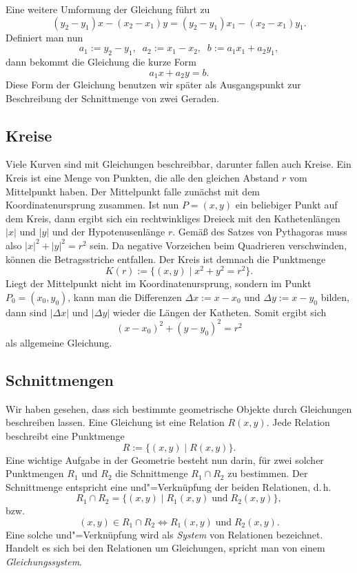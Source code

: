 Eine weitere Umformung der Gleichung führt zu
\[(y_2-y_1)x-(x_2-x_1)y
= (y_2-y_1)x_1-(x_2-x_1)y_1.\]
Definiert man nun
\[a_1:=y_2-y_1,\;\; a_2:=x_1-x_2,\;\; b:=a_1x_1+a_2y_1,\]
dann bekommt die Gleichung die kurze Form
\begin{equation}\label{eq:Gerade-kurz}
a_1 x + a_2 y = b.
\end{equation}
Diese Form der Gleichung benutzen wir später als Ausgangspunkt
zur Beschreibung der Schnittmenge von zwei Geraden.

\subsection{Kreise}

Viele Kurven sind mit Gleichungen beschreibbar, darunter fallen
auch Kreise. Ein Kreis ist eine Menge von Punkten, die alle
den gleichen Abstand $r$ vom Mittelpunkt haben. Der Mittelpunkt
falle zunächst mit dem Koordinatenursprung zusammen. Ist nun
$P=(x,y)$ ein beliebiger Punkt auf dem Kreis, dann ergibt sich
ein rechtwinkliges Dreieck mit den Kathetenlängen $|x|$ und $|y|$
und der Hypotenusenlänge $r$. Gemäß des Satzes von Pythagoras
muss also $|x|^2+|y|^2=r^2$ sein. Da negative Vorzeichen beim
Quadrieren verschwinden, können die Betragsstriche entfallen.
Der Kreis ist demnach die Punktmenge%
\begin{equation}
K(r) := \{(x,y)\mid x^2+y^2=r^2\}.
\end{equation}
Liegt der Mittelpunkt nicht im Koordinatenursprung, sondern im
Punkt $P_0=(x_0,y_0)$, kann man die Differenzen $\Delta x := x-x_0$
und $\Delta y := x-y_0$ bilden, dann sind $|\Delta x|$ und $|\Delta y|$
wieder die Längen der Katheten. Somit ergibt sich%
\begin{equation}\label{eq:Kreis-allgemein}
(x-x_0)^2+(y-y_0)^2=r^2
\end{equation}
als allgemeine Gleichung.

\subsection{Schnittmengen}

Wir haben gesehen, dass sich bestimmte geometrische Objekte durch
Gleichungen beschreiben lassen. Eine Gleichung ist eine Relation
$R(x,y)$. Jede Relation beschreibt eine Punktmenge%
\begin{equation}
R := \{(x,y)\mid R(x,y)\}.
\end{equation}
Eine wichtige Aufgabe in der Geometrie besteht nun darin, für
zwei solcher Punktmengen $R_1$ und $R_2$ die Schnittmenge
$R_1\cap R_2$ zu bestimmen. Der Schnittmenge entspricht
eine und"=Verknüpfung der beiden Relationen, d.\,h.%
\begin{equation}
R_1\cap R_2 = \{(x,y)\mid R_1(x,y)\;\text{und}\; R_2(x,y)\},
\end{equation}
bzw.
\begin{equation}
(x,y)\in R_1\cap R_2 \Leftrightarrow R_1(x,y)\;\text{und}\; R_2(x,y).
\end{equation}
Eine solche und"=Verknüpfung wird als \emph{System} von
Relationen bezeichnet. Handelt es sich bei den Relationen um
Gleichungen, spricht man von einem \emph{Gleichungssystem}.

